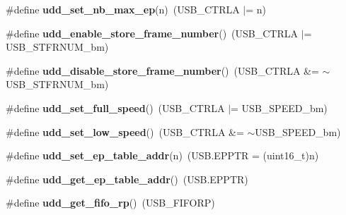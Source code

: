 \begin{DoxyCompactItemize}
\item 
\hypertarget{group__udd__xmega__usb__group_ga14ed95528b80214dd1df09b5b7598586}{\#define {\bfseries udd\-\_\-set\-\_\-nb\-\_\-max\-\_\-ep}(n)~(U\-S\-B\-\_\-\-C\-T\-R\-L\-A $|$= n)}\label{group__udd__xmega__usb__group_ga14ed95528b80214dd1df09b5b7598586}

\item 
\hypertarget{group__udd__xmega__usb__group_gab08620be78796aad64041954be11182f}{\#define {\bfseries udd\-\_\-enable\-\_\-store\-\_\-frame\-\_\-number}()~(U\-S\-B\-\_\-\-C\-T\-R\-L\-A $|$= U\-S\-B\-\_\-\-S\-T\-F\-R\-N\-U\-M\-\_\-bm)}\label{group__udd__xmega__usb__group_gab08620be78796aad64041954be11182f}

\item 
\hypertarget{group__udd__xmega__usb__group_ga860cdccc855a04ac37d38597816458b8}{\#define {\bfseries udd\-\_\-disable\-\_\-store\-\_\-frame\-\_\-number}()~(U\-S\-B\-\_\-\-C\-T\-R\-L\-A \&= $\sim$U\-S\-B\-\_\-\-S\-T\-F\-R\-N\-U\-M\-\_\-bm)}\label{group__udd__xmega__usb__group_ga860cdccc855a04ac37d38597816458b8}

\item 
\hypertarget{group__udd__xmega__usb__group_gad52e281c388e027a7c08159af2748e8a}{\#define {\bfseries udd\-\_\-set\-\_\-full\-\_\-speed}()~(U\-S\-B\-\_\-\-C\-T\-R\-L\-A $|$= U\-S\-B\-\_\-\-S\-P\-E\-E\-D\-\_\-bm)}\label{group__udd__xmega__usb__group_gad52e281c388e027a7c08159af2748e8a}

\item 
\hypertarget{group__udd__xmega__usb__group_gabfd20b45d237cbbdcef8e8784da880bb}{\#define {\bfseries udd\-\_\-set\-\_\-low\-\_\-speed}()~(U\-S\-B\-\_\-\-C\-T\-R\-L\-A \&= $\sim$U\-S\-B\-\_\-\-S\-P\-E\-E\-D\-\_\-bm)}\label{group__udd__xmega__usb__group_gabfd20b45d237cbbdcef8e8784da880bb}

\item 
\hypertarget{group__udd__xmega__usb__group_ga7b2b0dff485302cbcfb93959038d2273}{\#define {\bfseries udd\-\_\-set\-\_\-ep\-\_\-table\-\_\-addr}(n)~(U\-S\-B.\-E\-P\-P\-T\-R = (uint16\-\_\-t)n)}\label{group__udd__xmega__usb__group_ga7b2b0dff485302cbcfb93959038d2273}

\item 
\hypertarget{group__udd__xmega__usb__group_ga7997857ef462537a13e961eb03505ec0}{\#define {\bfseries udd\-\_\-get\-\_\-ep\-\_\-table\-\_\-addr}()~(U\-S\-B.\-E\-P\-P\-T\-R)}\label{group__udd__xmega__usb__group_ga7997857ef462537a13e961eb03505ec0}

\item 
\hypertarget{group__udd__xmega__usb__group_ga55620b0a684e97d30e6acc1d35e98a32}{\#define {\bfseries udd\-\_\-get\-\_\-fifo\-\_\-rp}()~(U\-S\-B\-\_\-\-F\-I\-F\-O\-R\-P)}\label{group__udd__xmega__usb__group_ga55620b0a684e97d30e6acc1d35e98a32}


\end{DoxyCompactItemize}
